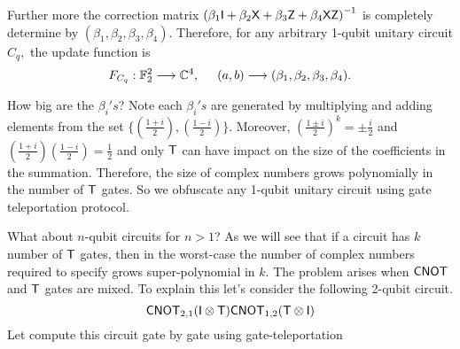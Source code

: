 Further more the correction matrix $\left(\beta_1 {\sf I}+\beta_2 {\sf X}+\beta_3 {\sf Z}+\beta_4 {\sf X} {\sf Z}\right)^{-1}$  is completely determine by $(\beta_1, \beta_2, \beta_3, \beta_4).$ Therefore, for any arbitrary 1-qubit unitary circuit $C_q,$ the update function is $$F_{C_q}: \mathbb{F}_2^2 \longrightarrow \mathbb{C}^4,\hspace{0.5cm} (a,b)\longrightarrow (\beta_1,\beta_2,\beta_3, \beta_4).$$

%
%


How big  are the $\beta_i's $? Note each $\beta_i's$ are generated by multiplying and adding elements from the set $\{\left(\frac{1+i}{2}\right), \left(\frac{1-i}{2}\right)\}.$ Moreover, $\left(\frac{1\pm i}{2}\right)^k=\pm \frac{i}{2}$ and
$\left(\frac{1+ i}{2}\right)\left(\frac{1- i}{2}\right)=\frac{1}{2}$ and only ${\sf T}$ can have impact on the size of the coefficients in the summation. Therefore, the size of complex numbers grows polynomially in the number of ${\sf T}$ gates.
So we obfuscate any 1-qubit unitary circuit using gate teleportation protocol.

What about $n$-qubit circuits for $n>1$? As we will see that if a circuit has $k$ number of ${\sf T}$ gates, then in the worst-case the number of complex numbers required to specify grows super-polynomial in $k.$ The problem arises when ${\sf CNOT}$ and ${\sf T}$ gates are mixed. To explain this let's consider the following 2-qubit circuit.
$${\sf CNOT}_{2,1}({\sf I}\otimes {\sf T}){\sf CNOT}_{1,2}({\sf T}\otimes {\sf I})$$
Let compute this circuit gate by gate using gate-teleportation

